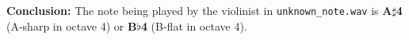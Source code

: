 \textbf{Conclusion:} The note being played by the violinist in \texttt{unknown\_note.wav} is \textbf{A$\sharp$4} (A-sharp in octave 4) or \textbf{B$\flat$4} (B-flat in octave 4).


